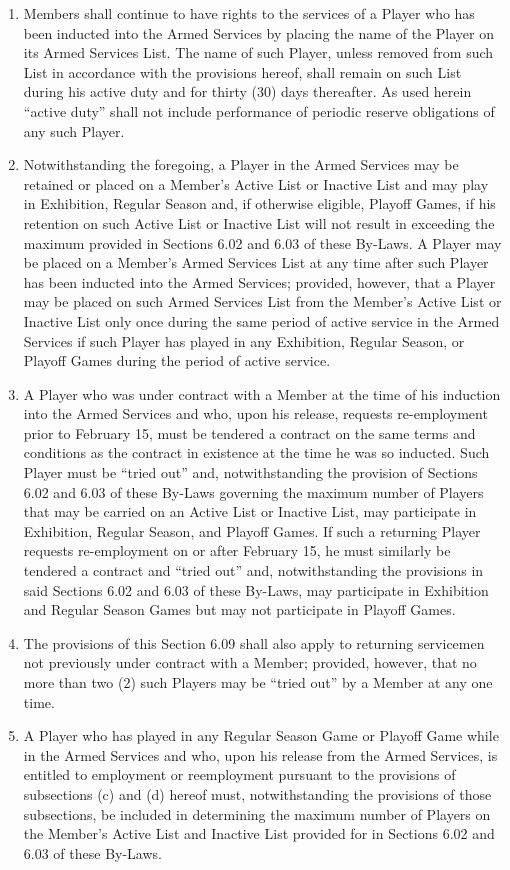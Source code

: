 \documentclass[]{book}
\providecommand{\tightlist}{%
  \setlength{\itemsep}{0pt}\setlength{\parskip}{0pt}}
\theoremstyle{definition}
\theoremstyle{definition}
\theoremstyle{definition}
\theoremstyle{remark}
\begin{document}
\begin{enumerate}
\def\labelenumi{(\alph{enumi})}
\tightlist
\item
  Members shall continue to have rights to the services of a Player who
  has been inducted into the Armed Services by placing the name of the
  Player on its Armed Services List. The name of such Player, unless
  removed from such List in accordance with the provisions hereof, shall
  remain on such List during his active duty and for thirty (30) days
  thereafter. As used herein ``active duty'' shall not include
  performance of periodic reserve obligations of any such Player.
\item
  Notwithstanding the foregoing, a Player in the Armed Services may be
  retained or placed on a Member's Active List or Inactive List and may
  play in Exhibition, Regular Season and, if otherwise eligible, Playoff
  Games, if his retention on such Active List or Inactive List will not
  result in exceeding the maximum provided in Sections 6.02 and 6.03 of
  these By-Laws. A Player may be placed on a Member's Armed Services
  List at any time after such Player has been inducted into the Armed
  Services; provided, however, that a Player may be placed on such Armed
  Services List from the Member's Active List or Inactive List only once
  during the same period of active service in the Armed Services if such
  Player has played in any Exhibition, Regular Season, or Playoff Games
  during the period of active service.
\item
  A Player who was under contract with a Member at the time of his
  induction into the Armed Services and who, upon his release, requests
  re-employment prior to February 15, must be tendered a contract on the
  same terms and conditions as the contract in existence at the time he
  was so inducted. Such Player must be ``tried out'' and,
  notwithstanding the provision of Sections 6.02 and 6.03 of these
  By-Laws governing the maximum number of Players that may be carried on
  an Active List or Inactive List, may participate in Exhibition,
  Regular Season, and Playoff Games. If such a returning Player requests
  re-employment on or after February 15, he must similarly be tendered a
  contract and ``tried out'' and, notwithstanding the provisions in said
  Sections 6.02 and 6.03 of these By-Laws, may participate in Exhibition
  and Regular Season Games but may not participate in Playoff Games.
\item
  The provisions of this Section 6.09 shall also apply to returning
  servicemen not previously under contract with a Member; provided,
  however, that no more than two (2) such Players may be ``tried out''
  by a Member at any one time.
\item
  A Player who has played in any Regular Season Game or Playoff Game
  while in the Armed Services and who, upon his release from the Armed
  Services, is entitled to employment or reemployment pursuant to the
  provisions of subsections (c) and (d) hereof must, notwithstanding the
  provisions of those subsections, be included in determining the
  maximum number of Players on the Member's Active List and Inactive
  List provided for in Sections 6.02 and 6.03 of these By-Laws.
\end{enumerate}
\end{document}
